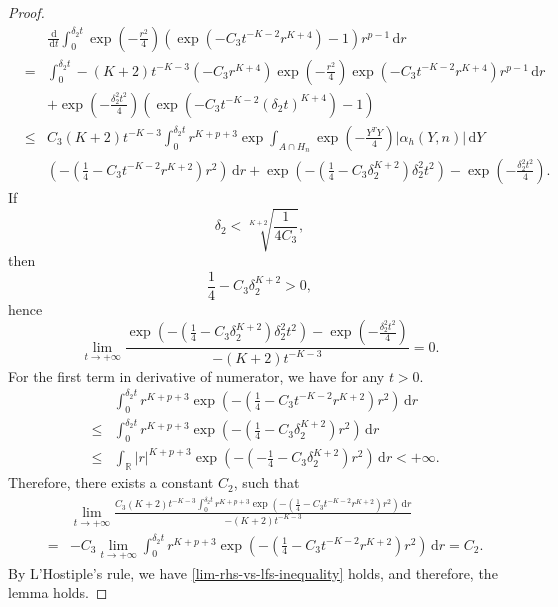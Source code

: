 \documentclass[oneside,english]{amsbook}
\numberwithin{section}{chapter}
\numberwithin{equation}{section}
\numberwithin{figure}{section}
\theoremstyle{plain}
\theoremstyle{plain}
\theoremstyle{definition}
\theoremstyle{plain}
\theoremstyle{plain}
\theoremstyle{remark}
\theoremstyle{definition}
\theoremstyle{definition}
\newcommand{\diff}{\,\mathrm{d}}
\begin{document}
\begin{proof}
\begin{eqnarray*}
 &  & \frac{\diff}{\diff t}\int_{0}^{\delta_{2}t}\exp\left(-\frac{r^{2}}{4}\right)\left(\exp\left(-C_{3}t^{-K-2}r^{K+4}\right)-1\right)r^{p-1}\diff r\\
 & = & \int_{0}^{\delta_{2}t}-\left(K+2\right)t^{-K-3}\left(-C_{3}r^{K+4}\right)\exp\left(-\frac{r^{2}}{4}\right)\exp\left(-C_{3}t^{-K-2}r^{K+4}\right)r^{p-1}\diff r\\
 &  & +\exp\left(-\frac{\delta_{2}^{2}t^{2}}{4}\right)\left(\exp\left(-C_{3}t^{-K-2}\left(\delta_{2}t\right)^{K+4}\right)-1\right)\\
 & \le & C_{3}\left(K+2\right)t^{-K-3}\int_{0}^{\delta_{2}t}r^{K+p+3}\exp\int_{A\cap H_{n}}\exp\left(-\frac{Y^{T}Y}{4}\right)\left|\alpha_{h}\left(Y,n\right)\right|\diff Y\\
 &  & \left(-\left(\frac{1}{4}-C_{3}t^{-K-2}r^{K+2}\right)r^{2}\right)\diff r+\exp\left(-\left(\frac{1}{4}-C_{3}\delta_{2}^{K+2}\right)\delta_{2}^{2}t^{2}\right)-\exp\left(-\frac{\delta_{2}^{2}t^{2}}{4}\right).
\end{eqnarray*}
If 
\[
\delta_{2}<\sqrt[K+2]{\frac{1}{4C_{3}}},
\]
then 
\[
\frac{1}{4}-C_{3}\delta_{2}^{K+2}>0,
\]
hence 
\[
\lim_{t\rightarrow+\infty}\frac{\exp\left(-\left(\frac{1}{4}-C_{3}\delta_{2}^{K+2}\right)\delta_{2}^{2}t^{2}\right)-\exp\left(-\frac{\delta_{2}^{2}t^{2}}{4}\right)}{-\left(K+2\right)t^{-K-3}}=0.
\]
For the first term in derivative of numerator, we have for any $t>0$.
\begin{eqnarray*}
 &  & \int_{0}^{\delta_{2}t}r^{K+p+3}\exp\left(-\left(\frac{1}{4}-C_{3}t^{-K-2}r^{K+2}\right)r^{2}\right)\diff r\\
 & \le & \int_{0}^{\delta_{2}t}r^{K+p+3}\exp\left(-\left(\frac{1}{4}-C_{3}\delta_{2}^{K+2}\right)r^{2}\right)\diff r\\
 & \le & \int_{\mathbb{R}}\left|r\right|^{K+p+3}\exp\left(-\left(-\frac{1}{4}-C_{3}\delta_{2}^{K+2}\right)r^{2}\right)\diff r<+\infty.
\end{eqnarray*}
Therefore, there exists a constant $C_{2}$, such that 
\begin{eqnarray*}
 &  & \lim_{t\rightarrow+\infty}\frac{C_{3}\left(K+2\right)t^{-K-3}\int_{0}^{\delta_{2}t}r^{K+p+3}\exp\left(-\left(\frac{1}{4}-C_{3}t^{-K-2}r^{K+2}\right)r^{2}\right)\diff r}{-\left(K+2\right)t^{-K-3}}\\
 & = & -C_{3}\lim_{t\rightarrow+\infty}\int_{0}^{\delta_{2}t}r^{K+p+3}\exp\left(-\left(\frac{1}{4}-C_{3}t^{-K-2}r^{K+2}\right)r^{2}\right)\diff r=C_{2}.
\end{eqnarray*}
By L'Hostiple's rule, we have \eqref{lim-rhs-vs-lfs-inequality} holds,
and therefore, the lemma holds.\end{proof}
\end{document}
